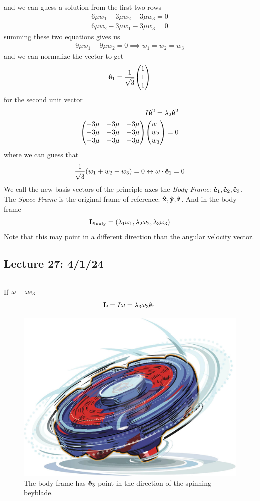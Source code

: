 \documentclass[../main.tex]{subfiles}
\begin{document}
and we can guess a solution from the first two rows
\begin{align*}
    6\mu w_1 - 3\mu w_2 - 3\mu w_3 = 0 \\
    6\mu w_2 - 3\mu w_1 - 3\mu w_3 = 0
\end{align*}
summing these two equations gives us
\begin{align*}
    9\mu w_1 - 9\mu w_2 = 0 \implies w_1 = w_2 = w_3
\end{align*}
and we can normalize the vector to get
\begin{align*}
    \vu e_1 = \frac{1}{\sqrt{3}} \mqty(1 \\ 1 \\ 1)
\end{align*}
for the second unit vector
\begin{align*}
    I \vu e^2 = \lambda_2 \vu e^2 \\
    \mqty(-3\mu & -3\mu & -3\mu \\ -3\mu & -3\mu & -3\mu \\ -3\mu & -3\mu & -3\mu)
    \mqty(w_1 \\ w_2 \\ w_3) = 0
\end{align*}
where we can guess that
\begin{align*}
    \frac{1}{\sqrt{3}} (w_1 + w_2 + w_3) = 0 \leftrightarrow \vb \omega \cdot \vu e_1 = 0
\end{align*}
We call the new basis vectors of the principle axes the \emph{Body Frame}: $\vu e_1, \vu e_2, \vu e_3$.
The \emph{Space Frame} is the original frame of reference: $\vu x, \vu y, \vu z$. And in the body 
frame
\begin{align*}
    \vb L_{\text{body}} = (\lambda_1 \omega_1, \lambda_2 \omega_2, \lambda_3 \omega_3)
\end{align*}
Note that this may point in a different direction than the angular velocity vector.

\newpage
\subsection*{Lecture 27: \hfill 4/1/24}
\hrule \vspace{10px}
If $\vb \omega = \omega e_3$
\begin{align*}
    \vb L = I \vb \omega = \lambda_3 \omega_3 \vu e_1
\end{align*}
\begin{figure}[ht]
    \centering
    \includegraphics[width=0.5\linewidth]{beyblade.jpeg}
    \caption{The body frame has $\vu e_3$ point in the direction of the spinning beyblade.}
\end{figure}
\end{document}

